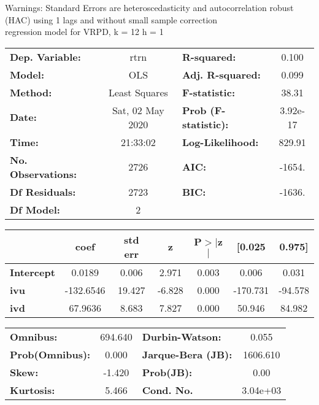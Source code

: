 Warnings: \newline
 [1] Standard Errors are heteroscedasticity and autocorrelation robust (HAC) using 1 lags and without small sample correction\\ 

regression model for VRPD, k = 12 h = 1\begin{center}
\begin{tabular}{lclc}
\toprule
\textbf{Dep. Variable:}    &       rtrn       & \textbf{  R-squared:         } &     0.100   \\
\textbf{Model:}            &       OLS        & \textbf{  Adj. R-squared:    } &     0.099   \\
\textbf{Method:}           &  Least Squares   & \textbf{  F-statistic:       } &     38.31   \\
\textbf{Date:}             & Sat, 02 May 2020 & \textbf{  Prob (F-statistic):} &  3.92e-17   \\
\textbf{Time:}             &     21:33:02     & \textbf{  Log-Likelihood:    } &    829.91   \\
\textbf{No. Observations:} &        2726      & \textbf{  AIC:               } &    -1654.   \\
\textbf{Df Residuals:}     &        2723      & \textbf{  BIC:               } &    -1636.   \\
\textbf{Df Model:}         &           2      & \textbf{                     } &             \\
\bottomrule
\end{tabular}
\begin{tabular}{lcccccc}
                   & \textbf{coef} & \textbf{std err} & \textbf{z} & \textbf{P$> |$z$|$} & \textbf{[0.025} & \textbf{0.975]}  \\
\midrule
\textbf{Intercept} &       0.0189  &        0.006     &     2.971  &         0.003        &        0.006    &        0.031     \\
\textbf{ivu}       &    -132.6546  &       19.427     &    -6.828  &         0.000        &     -170.731    &      -94.578     \\
\textbf{ivd}       &      67.9636  &        8.683     &     7.827  &         0.000        &       50.946    &       84.982     \\
\bottomrule
\end{tabular}
\begin{tabular}{lclc}
\textbf{Omnibus:}       & 694.640 & \textbf{  Durbin-Watson:     } &    0.055  \\
\textbf{Prob(Omnibus):} &   0.000 & \textbf{  Jarque-Bera (JB):  } & 1606.610  \\
\textbf{Skew:}          &  -1.420 & \textbf{  Prob(JB):          } &     0.00  \\
\textbf{Kurtosis:}      &   5.466 & \textbf{  Cond. No.          } & 3.04e+03  \\
\bottomrule
\end{tabular}
\end{center}


